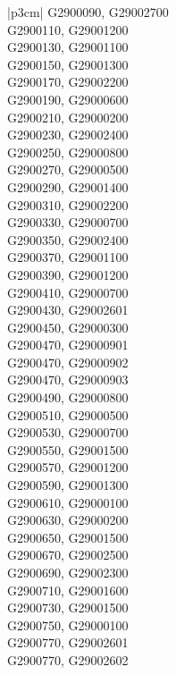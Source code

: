 \begin{customLongTable}{ |p{3cm}| }
G2900090, G29002700 \\ \hline
G2900110, G29001200 \\ \hline
G2900130, G29001100 \\ \hline
G2900150, G29001300 \\ \hline
G2900170, G29002200 \\ \hline
G2900190, G29000600 \\ \hline
G2900210, G29000200 \\ \hline
G2900230, G29002400 \\ \hline
G2900250, G29000800 \\ \hline
G2900270, G29000500 \\ \hline
G2900290, G29001400 \\ \hline
G2900310, G29002200 \\ \hline
G2900330, G29000700 \\ \hline
G2900350, G29002400 \\ \hline
G2900370, G29001100 \\ \hline
G2900390, G29001200 \\ \hline
G2900410, G29000700 \\ \hline
G2900430, G29002601 \\ \hline
G2900450, G29000300 \\ \hline
G2900470, G29000901 \\ \hline
G2900470, G29000902 \\ \hline
G2900470, G29000903 \\ \hline
G2900490, G29000800 \\ \hline
G2900510, G29000500 \\ \hline
G2900530, G29000700 \\ \hline
G2900550, G29001500 \\ \hline
G2900570, G29001200 \\ \hline
G2900590, G29001300 \\ \hline
G2900610, G29000100 \\ \hline
G2900630, G29000200 \\ \hline
G2900650, G29001500 \\ \hline
G2900670, G29002500 \\ \hline
G2900690, G29002300 \\ \hline
G2900710, G29001600 \\ \hline
G2900730, G29001500 \\ \hline
G2900750, G29000100 \\ \hline
G2900770, G29002601 \\ \hline
G2900770, G29002602 \\ \hline

\end{customLongTable}
